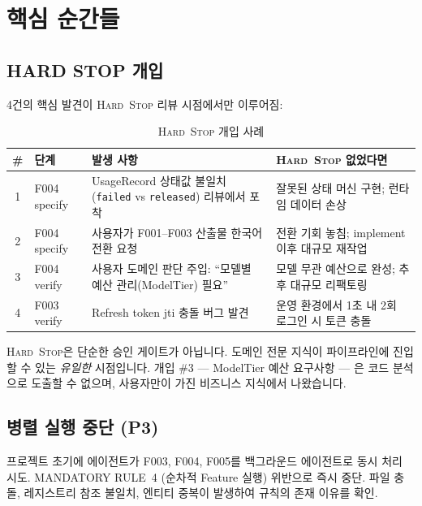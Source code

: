 \documentclass[11pt,a4paper,openright,twoside]{report}
\newcommand{\hardstop}{\textsc{Hard~Stop}}
\begin{document}
\section{핵심 순간들}

\subsection{HARD STOP 개입}

4건의 핵심 발견이 \hardstop{} 리뷰 시점에서만 이루어짐:

\begin{table}[H]
\centering
\caption{\hardstop{} 개입 사례}
\label{tab:aegis-hardstop-ko}
\begin{tabularx}{\textwidth}{clXX}
\toprule
\textbf{\#} & \textbf{단계} & \textbf{발생 사항} & \textbf{\hardstop{} 없었다면} \\
\midrule
1 & F004 specify & UsageRecord 상태값 불일치 (\texttt{failed} vs \texttt{released}) 리뷰에서 포착 & 잘못된 상태 머신 구현; 런타임 데이터 손상 \\
2 & F004 specify & 사용자가 F001--F003 산출물 한국어 전환 요청 & 전환 기회 놓침; implement 이후 대규모 재작업 \\
3 & F004 verify & 사용자 도메인 판단 주입: ``모델별 예산 관리(ModelTier) 필요'' & 모델 무관 예산으로 완성; 추후 대규모 리팩토링 \\
4 & F003 verify & Refresh token jti 충돌 버그 발견 & 운영 환경에서 1초 내 2회 로그인 시 토큰 충돌 \\
\bottomrule
\end{tabularx}
\end{table}

\begin{dangerbox}[핵심 통찰]
\hardstop{}은 단순한 승인 게이트가 아닙니다. 도메인 전문 지식이 파이프라인에 진입할 수 있는 \emph{유일한} 시점입니다. 개입 \#3 --- ModelTier 예산 요구사항 --- 은 코드 분석으로 도출할 수 없으며, 사용자만이 가진 비즈니스 지식에서 나왔습니다.
\end{dangerbox}

\subsection{병렬 실행 중단 (P3)}

프로젝트 초기에 에이전트가 F003, F004, F005를 백그라운드 에이전트로 동시 처리 시도. MANDATORY RULE~4 (순차적 Feature 실행) 위반으로 즉시 중단. 파일 충돌, 레지스트리 참조 불일치, 엔티티 중복이 발생하여 규칙의 존재 이유를 확인.
\end{document}
